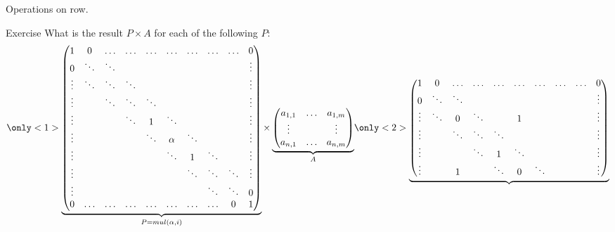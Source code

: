 \documentclass{beamer}
\begin{document}
  \begin{frame}{Operations on row.}
    
    \begin{block}{Exercise}
      What is the result $P \times A$ for each of the following $P$:
      \[
      \only<1>{
        \underbrace{
          \begin{pmatrix}
            1 & 0 & \dots & \dots & \dots & \dots & \dots & \dots & \dots & 0 \\
            0 & \ddots & \ddots &  &  & & & & & \vdots \\
            \vdots & \ddots & \ddots & \ddots &    &   &  &  &  & \vdots\\
            \vdots &   & \ddots & \ddots & \ddots   &  &   &   &   & \vdots\\
            \vdots &  &  & \ddots & 1 & \ddots &  &   &  & \vdots\\
            \vdots &  & &  & \ddots & \alpha & \ddots &  & & \vdots\\
            \vdots & &  &  & & \ddots & 1 & \ddots & & \vdots\\
            \vdots &   &   &   &   &   & \ddots & \ddots & \ddots   & \vdots\\
            \vdots &   &   &  &   &    &  & \ddots  & \ddots & 0\\
            0 & \dots & \dots & \dots & \dots & \dots & \dots & \dots  & 0 & 1\\
      \end{pmatrix}}_{P = mul(\alpha, i)} \times \underbrace{\begin{pmatrix} a_{1,1} & \dots & a_{1,m}\\ \vdots & & \vdots\\ a_{n,1} & \dots & a_{n, m} \end{pmatrix}}_{A}}
      \only<2>{
        \underbrace{
        \begin{pmatrix}
            1 & 0 & \dots & \dots & \dots & \dots & \dots & \dots & \dots & 0 \\
            0 & \ddots & \ddots &  &  & & & & & \vdots \\
            \vdots & \ddots & 0 & \ddots &    & 1  &  &  &  & \vdots\\
            \vdots &   & \ddots & \ddots & \ddots   &  &   &   &   & \vdots\\
            \vdots &  &  & \ddots & 1 & \ddots &  &   &  & \vdots\\
            \vdots &  & 1  &  & \ddots & 0 &  \ddots &  & & \vdots\\

\end{pmatrix}}}\]
\end{block}
\end{frame}
\end{document}
